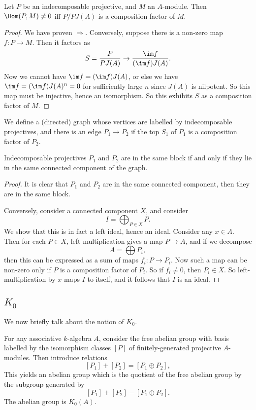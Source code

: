 \documentclass[a4paper]{article}
\begin{document}
\begin{lemma}
  Let $P$ be an indecomposable projective, and $M$ an $A$-module. Then $\Hom(P, M) \not= 0$ iff $P/P J(A)$ is a composition factor of $M$.
\end{lemma}

\begin{proof}
  We have proven $\Rightarrow$. Conversely, suppose there is a non-zero map $f: P \to M$. Then it factors as
  \[
    S = \frac{P}{PJ(A)} \to \frac{\im f}{(\im f)J(A)}.
  \]
  Now we cannot have $\im f = (\im f)J(A)$, or else we have $\im f = (\im f)J(A)^n = 0$ for sufficiently large $n$ since $J(A)$ is nilpotent. So this map must be injective, hence an isomorphism. So this exhibits $S$ as a composition factor of $M$.
\end{proof}

We define a (directed) graph whose vertices are labelled by indecomposable projectives, and there is an edge $P_1 \to P_2$ if the top $S_1$ of $P_1$ is a composition factor of $P_2$.
\begin{thm}
  Indecomposable projectives $P_1$ and $P_2$ are in the same block if and only if they lie in the same connected component of the graph.
\end{thm}

\begin{proof}
  It is clear that $P_1$ and $P_2$ are in the same connected component, then they are in the same block.

  Conversely, consider a connected component $X$, and consider
  \[
    I = \bigoplus_{P \in X} P.
  \]
  We show that this is in fact a left ideal, hence an ideal. Consider any $x \in A$. Then for each $P \in X$, left-multiplication gives a map $P \to A$, and if we decompose
  \[
    A = \bigoplus P_i,
  \]
  then this can be expressed as a sum of maps $f_i: P \to P_i$. Now such a map can be non-zero only if $P$ is a composition factor of $P_i$. So if $f_i \not= 0$, then $P_i \in X$. So left-multiplication by $x$ maps $I$ to itself, and it follows that $I$ is an ideal.
\end{proof}

\subsection{\texorpdfstring{$K_0$}{K_0}}
We now briefly talk about the notion of $K_0$.
\begin{defi}[$K_0$]
  For any associative $k$-algebra $A$, consider the free abelian group with basis labelled by the isomorphism classes $[P]$ of finitely-generated projective $A$-modules. Then introduce relations
  \[
    [P_1] + [P_2] = [P_1 \oplus P_2],
  \]
  This yields an abelian group which is the quotient of the free abelian group by the subgroup generated by
  \[
    [P_1] + [P_2] - [P_1 \oplus P_2].
  \]
  The abelian group is $K_0(A)$.
\end{defi}
\end{document}
